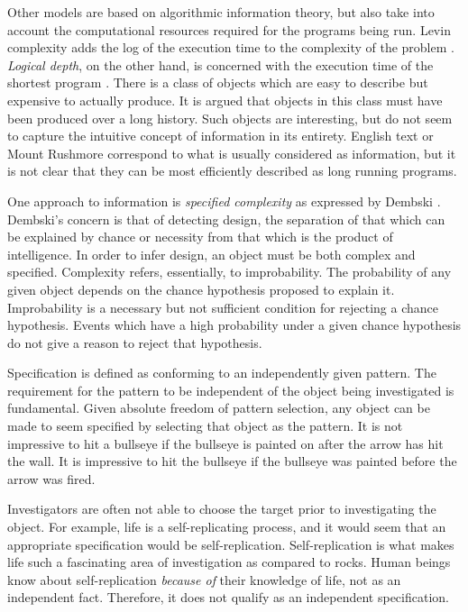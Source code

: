 Other models are based on algorithmic information theory, but also take into account the computational resources required for the programs being run.
Levin complexity adds the log of the execution time to the complexity of the problem \citep{Levin1976}.
\textit{Logical depth}, on the other hand, is concerned with the execution time of the shortest program \citep{Bennett1988}.
There is a class of objects which are easy to describe but expensive to actually produce.
It is argued \citep{Bennett1988} that objects in this class must have been produced over a long history.
Such objects are interesting, but do not seem to capture the intuitive concept of information in its entirety.
English text or Mount Rushmore correspond to what is usually considered as information, but it is not clear that they can be most efficiently described as long running programs.

One approach to information is \textit{specified complexity} as expressed by Dembski \citep{Dembski1998}.
Dembski's concern is that of detecting design, the separation of that which can be explained by chance or necessity from that which is the product of intelligence. 
In order to infer design, an object must be both complex and specified.
Complexity refers, essentially, to improbability.
The probability of any given object depends on the chance hypothesis proposed to explain it.
Improbability is a necessary but not sufficient condition for rejecting a chance hypothesis.
Events which have a high probability under a given chance hypothesis do not give a reason to reject that hypothesis.

Specification is defined as conforming to an independently given pattern.
The requirement for the pattern to be independent of the object being investigated is fundamental.
Given absolute freedom of pattern selection, any object can be made to seem specified by selecting that object as the pattern.
It is not impressive to hit a bullseye if the bullseye is painted on after the arrow has hit the wall.
It is impressive to hit the bullseye if the bullseye was painted before the arrow was fired.

Investigators are often not able to choose the target prior to investigating the object.
For example, life is a self-replicating process, and it would seem that an appropriate specification would be self-replication.
Self-replication is what makes life such a fascinating area of investigation as compared to rocks.
Human beings know about self-replication \emph{because of} their knowledge of life, not as an independent fact.
Therefore, it does not qualify as an independent specification.

